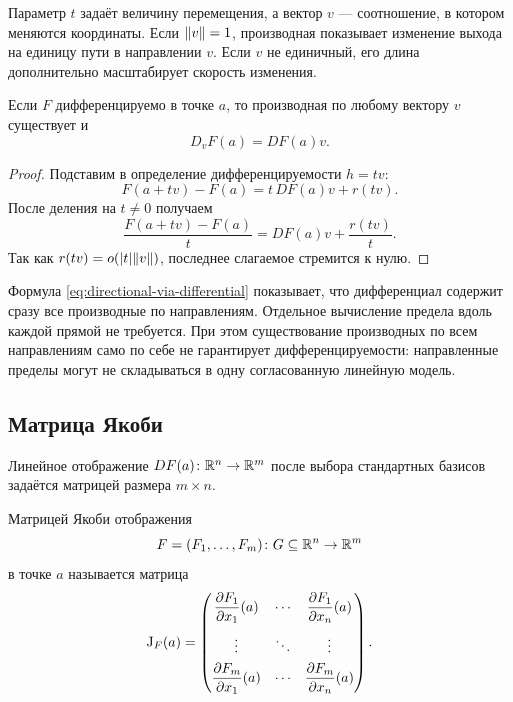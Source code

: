 Параметр \(t\) задаёт величину перемещения, а вектор \(v\) --- соотношение, в котором меняются координаты. Если \(\lVert v\rVert=1\), производная показывает изменение выхода на единицу пути в направлении \(v\). Если \(v\) не единичный, его длина дополнительно масштабирует скорость изменения.

\begin{theorem}
Если \(F\) дифференцируемо в точке \(a\), то производная по любому вектору \(v\) существует и
\begin{equation}
D_vF(a)=DF(a)v.
\label{eq:directional-via-differential}
\end{equation}
\end{theorem}

\begin{proof}
Подставим в определение дифференцируемости \(h=t v\):
\[
F(a+t v)-F(a)
=
t\,DF(a)v+r(tv).
\]
После деления на \(t\neq0\) получаем
\[
\frac{F(a+t v)-F(a)}{t}
=
DF(a)v+\frac{r(tv)}{t}.
\]
Так как \(r(tv)=o(\lvert t\rvert\lVert v\rVert)\), последнее слагаемое стремится к нулю.
\end{proof}

Формула \eqref{eq:directional-via-differential} показывает, что дифференциал содержит сразу все производные по направлениям. Отдельное вычисление предела вдоль каждой прямой не требуется. При этом существование производных по всем направлениям само по себе не гарантирует дифференцируемости: направленные пределы могут не складываться в одну согласованную линейную модель.

\subsection{Матрица Якоби}

Линейное отображение \(DF(a)\colon\mathbb{R}^n\to\mathbb{R}^m\) после выбора стандартных базисов задаётся матрицей размера \(m\times n\).

\begin{definition}
Матрицей Якоби отображения
\[
F=(F_1,\dots,F_m)\colon G\subseteq\mathbb{R}^n\to\mathbb{R}^m
\]
в точке \(a\) называется матрица
\begin{equation}
\mathrm{J}_{F}(a)
=
\begin{pmatrix}
\dfrac{\partial F_1}{\partial x_1}(a)
& \cdots &
\dfrac{\partial F_1}{\partial x_n}(a)\\[1.1em]
\vdots & \ddots & \vdots\\[0.4em]
\dfrac{\partial F_m}{\partial x_1}(a)
& \cdots &
\dfrac{\partial F_m}{\partial x_n}(a)
\end{pmatrix}.
\label{eq:jacobian-definition}
\end{equation}
\end{definition}

